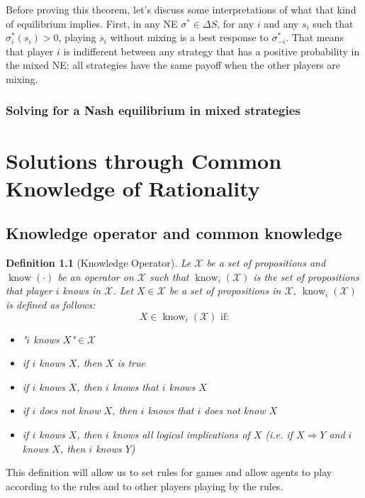 \documentclass[12pt]{report}
\newtheorem{definition}{Definition}[chapter]
\newcommand{\know}{\operatorname{know}}
\begin{document}
Before proving this theorem, let's discuss some interpretations of what that kind of equilibrium implies. First, in any NE $\sigma^*\in\Delta S$, for any $i$ and any $s_i$ such that $\sigma_i^*(s_i) > 0$, playing $s_i$ without mixing is a best response to $\sigma_{-i}^*$. That means that player $i$ is indifferent between any strategy that has a positive probability in the mixed NE: all strategies have the same payoff when the other players are mixing.

\subsection{Solving for a Nash equilibrium in mixed strategies}



\chapter{Solutions through Common Knowledge of Rationality}

\section{Knowledge operator and common knowledge}

\begin{definition}[Knowledge Operator]
Le $\mathcal{X}$ be a set of propositions and $\know(\cdot)$ be an operator on $\mathcal{X}$ such that $\know_i(\mathcal{X})$ is the set of propositions that player $i$ knows in $\mathcal{X}$. Let $X\in\mathcal{X}$ be a set of propositions in $\mathcal{X}$, $\know_i(\mathcal{X})$ is defined as follows: $$X\in\know_i(\mathcal{X})\text{ if:}$$\begin{itemize}
\item "$i$ knows $X$"$\in\mathcal{X}$
\item if $i$ knows $X$, then $X$ is true
\item if $i$ knows $X$, then $i$ knows that $i$ knows $X$
\item if $i$ does not know $X$, then $i$ knows that $i$ does not know $X$
\item if $i$ knows $X$, then $i$ knows all logical implications of $X$ (i.e. if $X\Rightarrow Y$ and $i$ knows $X$, then $i$ knows $Y$)
\end{itemize}
\end{definition}

This definition will allow us to set rules for games and allow agents to play according to the rules and to other players playing by the rules.
\end{document}

